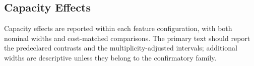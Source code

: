 \subsection{Capacity Effects}
Capacity effects are reported within each feature configuration, with both
nominal widths and cost-matched comparisons. The primary text should report
the predeclared contrasts and the multiplicity-adjusted intervals; additional
widths are descriptive unless they belong to the confirmatory family.
